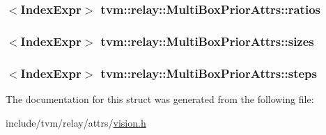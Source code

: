 \subsubsection[{\texorpdfstring{ratios}{ratios}}]{$<${\bf Index\+Expr}$>$ tvm\+::relay\+::\+Multi\+Box\+Prior\+Attrs\+::ratios}\hypertarget{structtvm_1_1relay_1_1MultiBoxPriorAttrs_af674c8ba5ac7021827987bca3e1e4b1a}{}\label{structtvm_1_1relay_1_1MultiBoxPriorAttrs_af674c8ba5ac7021827987bca3e1e4b1a}
\subsubsection[{\texorpdfstring{sizes}{sizes}}]{$<${\bf Index\+Expr}$>$ tvm\+::relay\+::\+Multi\+Box\+Prior\+Attrs\+::sizes}\hypertarget{structtvm_1_1relay_1_1MultiBoxPriorAttrs_ad6d089344fa741021584222ffa70a451}{}\label{structtvm_1_1relay_1_1MultiBoxPriorAttrs_ad6d089344fa741021584222ffa70a451}
\subsubsection[{\texorpdfstring{steps}{steps}}]{$<${\bf Index\+Expr}$>$ tvm\+::relay\+::\+Multi\+Box\+Prior\+Attrs\+::steps}\hypertarget{structtvm_1_1relay_1_1MultiBoxPriorAttrs_a312f6999492eb61bf20593a4f30acd35}{}\label{structtvm_1_1relay_1_1MultiBoxPriorAttrs_a312f6999492eb61bf20593a4f30acd35}


The documentation for this struct was generated from the following file\+:\begin{DoxyCompactItemize}
\item 
include/tvm/relay/attrs/\hyperlink{vision_8h}{vision.\+h}\end{DoxyCompactItemize}
